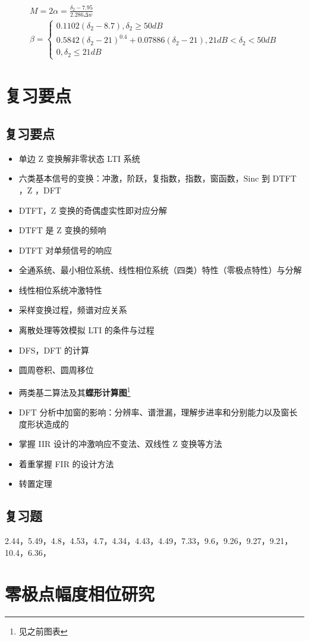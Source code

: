 \documentclass[cn,11pt,chinese,black,simple]{elegantbook}
\begin{document}
\[
\begin{array}{l}
M=2 \alpha=\frac{\delta_{2}-7.95}{2.286 \Delta w} \\
\beta=\left\{\begin{array}{l}
0.1102\left(\delta_{2}-8.7\right), \delta_{2} \geq 50 d B \\
0.5842\left(\delta_{2}-21\right)^{0.4}+0.07886\left(\delta_{2}-21\right), 21 d B<\delta_{2}<50 d B \\
0, \delta_{2} \leq 21 d B
\end{array}\right.
\end{array}
\]

\chapter{复习要点}

\section{复习要点}

\begin{itemize}
    \item 单边 Z 变换解非零状态 LTI 系统
    \item 六类基本信号的变换：冲激，阶跃，复指数，指数，窗函数，\(\mathrm{Sinc}\) 到 DTFT ，Z ，DFT
    \item DTFT，Z 变换的奇偶虚实性即对应分解
    \item DTFT 是 Z 变换的频响
    \item DTFT 对单频信号的响应
    \item 全通系统、最小相位系统、线性相位系统（四类）特性（零极点特性）与分解
    \item 线性相位系统冲激特性
    \item 采样变换过程，频谱对应关系
    \item 离散处理等效模拟 LTI 的条件与过程
    \item DFS，DFT 的计算
    \item 圆周卷积、圆周移位
    \item 两类基二算法及其\textbf{蝶形计算图}\footnote{见之前图表}
    \item DFT 分析中加窗的影响：分辨率、谱泄漏，理解步进率和分别能力以及窗长度形状造成的
    \item 掌握 IIR 设计的冲激响应不变法、双线性 Z 变换等方法
    \item 着重掌握 FIR 的设计方法
    \item 转置定理
\end{itemize}

\section{复习题}

2.44，5.49，4.8，4.53，4.7，4.34，4.43，4.49，7.33，9.6，9.26，9.27，9.21，10.4，6.36，


\appendix

\chapter{零极点幅度相位研究}




\let\chapname\undefined
\ifx\mainclass\undefined
\end{document}
